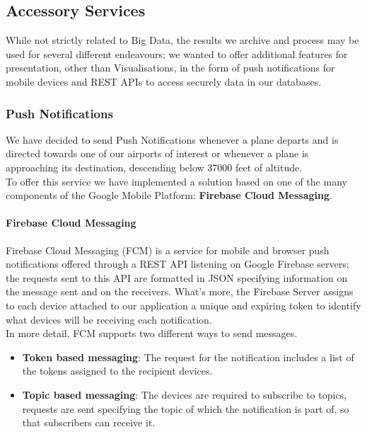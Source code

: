 \subsection{Accessory Services}

While not strictly related to Big Data, the results we archive and process may be used for several different endeavours; we wanted to offer additional features for presentation, other than Visualisations, in the form of push notifications for mobile devices and REST APIs to access securely data in our databases.

\subsubsection{Push Notifications}
We have decided to send Push Notifications whenever a plane departs and is directed towards one of our airports of interest or whenever a plane is approaching its destination, descending below 37000 feet of altitude.
\\
To offer this service we have implemented a solution based on one of the many components of the Google Mobile Platform: \textbf{Firebase Cloud Messaging}.

\paragraph{Firebase Cloud Messaging}

Firebase Cloud Messaging (FCM) is a service for mobile and browser push notifications offered through a REST API listening on Google Firebase servers; the requests sent to this API are formatted in JSON specifying information on the message sent and on the receivers.
What's more, the Firebase Server assigns to each device attached to our application a unique and expiring token to identify what devices will be receiving each notification.
\\
In more detail, FCM supports two different ways to send messages.

\begin{itemize}
	\item \textbf{Token based messaging}: The request for the notification includes a list of the tokens assigned to the recipient devices. 
	\item \textbf{Topic based messaging}: The devices are required to subscribe to topics, requests are sent specifying the topic of which the notification is part of, so that subscribers can receive it.
\end{itemize}  

